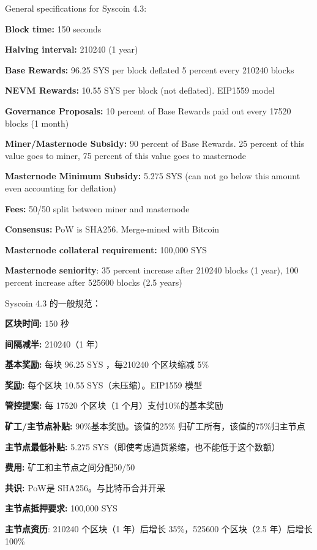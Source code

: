 \documentclass{ctexart}
\begin{document}
General specifications for Syscoin 4.3:

\begin{description}[font=$\bullet$~\normalfont\scshape\color{blue!50!black}]
\item \textbf{Block time:} 150 seconds
\item \textbf{Halving interval:} 210240 (1 year)
\item \textbf{Base Rewards:}  96.25 SYS per block deflated 5 percent every 210240 blocks
\item \textbf{NEVM Rewards:}  10.55 SYS per block (not deflated). EIP1559 model
\item \textbf{Governance Proposals:}  10 percent of Base Rewards paid out every 17520 blocks (1 month)
\item \textbf{Miner/Masternode Subsidy:}  90 percent of Base Rewards. 25 percent of this value goes to miner, 75 percent of this value goes to masternode
\item \textbf{Masternode Minimum Subsidy:} 5.275 SYS (can not go below this amount even accounting for deflation)
\item \textbf{Fees:}  50/50 split between miner and masternode
\item \textbf{Consensus:} PoW is SHA256. Merge-mined with Bitcoin
\item \textbf{Masternode collateral requirement:} 100,000 SYS
\item \textbf{Masternode seniority}: 35 percent increase after 210240 blocks (1 year), 100 percent increase after 525600 blocks (2.5 years)
\end{description}

Syscoin 4.3 的一般规范：

\begin{description}[font=$\bullet$~\normalfont\scshape\color{blue!50!black}]
\item \textbf{区块时间:} 150 秒
\item \textbf{间隔减半:} 210240（1 年）
\item \textbf{ 基本奖励:}  每块 96.25 SYS ，每210240 个区块缩减 5\%
\item \textbf{奖励:}  每个区块 10.55 SYS（未压缩）。EIP1559 模型
\item \textbf{管控提案:}  每 17520 个区块（1 个月）支付10\%的基本奖励
\item \textbf{矿工/主节点补贴:}  90\%基本奖励。该值的25\% 归矿工所有，该值的75\%归主节点
\item \textbf{主节点最低补贴:} 5.275 SYS（即使考虑通货紧缩，也不能低于这个数额）
\item \textbf{费用:}  矿工和主节点之间分配50/50
\item \textbf{共识:} PoW是 SHA256。与比特币合并开采
\item \textbf{主节点抵押要求:} 100,000 SYS
\item \textbf{主节点资历}: 210240 个区块（1 年）后增长 35\%，525600 个区块（2.5 年）后增长100\%
\end{description}
\end{document}
